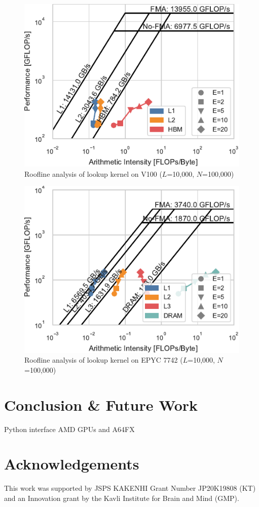 \documentclass[conference]{IEEEtran}
\begin{document}
\begin{figure}
    \centering
    \includegraphics{figs/roofline_lookup_wo_rho_v100}
    \caption{Roofline analysis of lookup kernel on V100 ($L$=10,000, $N$=100,000)}%
    \label{fig:roofline-lookup-v100}
\end{figure}

\begin{figure}
    \centering
    \includegraphics{figs/roofline_lookup_wo_rho_epyc}
    \caption{Roofline analysis of lookup kernel on EPYC 7742 ($L$=10,000, $N$=100,000)}%
    \label{fig:roofline-lookup-eypc}
\end{figure}

\section{Conclusion \& Future Work}

Python interface
AMD GPUs and A64FX

\section*{Acknowledgements}
This work was supported by JSPS KAKENHI Grant Number JP20K19808 (KT) and an
Innovation grant by the Kavli Institute for Brain and Mind (GMP).



\end{document}
